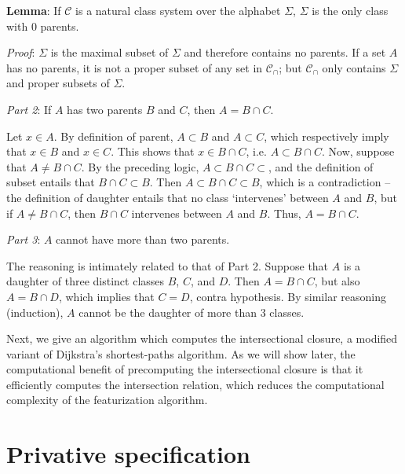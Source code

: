 \documentclass[11pt, oneside]{article}   	%
\begin{document}
\vspace{\baselineskip} \noindent \textbf{Lemma}: If $\mathcal C$ is a natural class system over the alphabet $\Sigma$, $\Sigma$ is the only class with 0 parents. 

\textit{Proof}: $\Sigma$ is the maximal subset of $\Sigma$ and therefore contains no parents. If a set $A$ has no parents, it is not a proper subset of any set in $\mathcal C_\cap$; but $\mathcal C_\cap$ only contains $\Sigma$ and proper subsets of $\Sigma$.

\noindent \textit{Part 2}: If $A$ has two parents $B$ and $C$, then $A = B \cap C$.

Let $x \in A$. By definition of parent, $A \subset B$ and $A \subset C$, which respectively imply that $x \in B$ and $x \in C$. This shows that $x \in B \cap C$, i.e. $A \subset B \cap C$. Now, suppose that $A \neq B \cap C$. By the preceding logic, $A \subset B \cap C \subset$, and the definition of subset entails that $B \cap C \subset B$. Then $A \subset B \cap C \subset B$, which is a contradiction -- the definition of daughter entails that no class `intervenes' between $A$ and $B$, but if $A \neq B \cap C$, then $B \cap C$ intervenes between $A$ and $B$. Thus, $A = B \cap C$.

\noindent \textit{Part 3}: $A$ cannot have more than two parents.

The reasoning is intimately related to that of Part 2. Suppose that $A$ is a daughter of three distinct classes $B$, $C$, and $D$. Then $A = B \cap C$, but also $A = B \cap D$, which implies that $C = D$, contra hypothesis. By similar reasoning (induction), $A$ cannot be the daughter of more than 3 classes. %


\vspace{\baselineskip} Next, we give an algorithm which computes the intersectional closure, a modified variant of Dijkstra's shortest-paths algorithm. As we will show later, the computational benefit of precomputing the intersectional closure is that it efficiently computes the intersection relation, which reduces the computational complexity of the featurization algorithm. \section{Privative specification}
\end{document}
